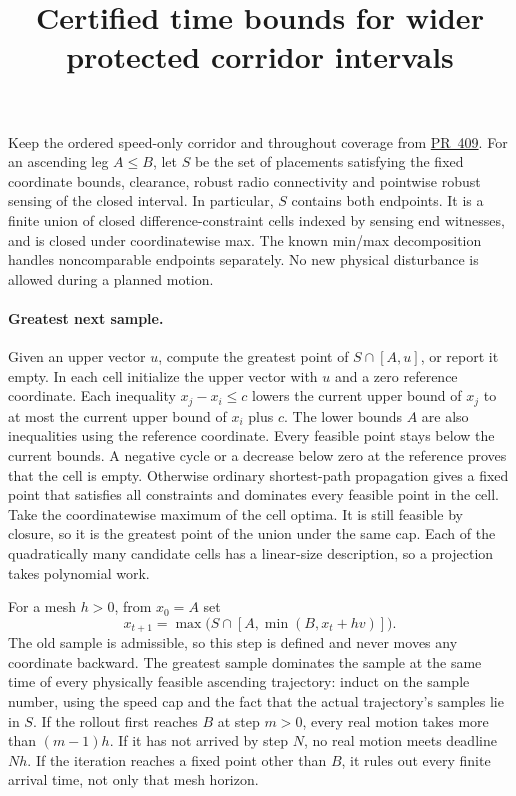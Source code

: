 \documentclass{article}
\title{Certified time bounds for wider protected corridor intervals}
\date{}
\begin{document}
\maketitle
Keep the ordered speed-only corridor and throughout coverage from
\href{https://github.com/eternal-november/eos-research-programmes/pull/409}{PR~409}.
For an ascending leg $A\le B$, let $S$ be the set of placements
satisfying the fixed coordinate bounds, clearance, robust radio
connectivity and pointwise robust sensing of the closed interval.
In particular, $S$ contains both endpoints. It is a finite union of
closed difference-constraint cells indexed by sensing end witnesses,
and is closed under coordinatewise max. The known min/max
decomposition handles noncomparable endpoints separately.
No new physical disturbance is allowed during a planned motion.

\paragraph{Greatest next sample.}
Given an upper vector $u$, compute the greatest point of
$S\cap[A,u]$, or report it empty. In each cell initialize the
upper vector with $u$ and a zero reference coordinate. Each inequality
$x_j-x_i\le c$ lowers the current upper bound of $x_j$ to at most
the current upper bound of $x_i$ plus $c$. The lower bounds $A$
are also inequalities using the reference coordinate. Every feasible
point stays below the current bounds. A negative cycle or a decrease
below zero at the reference proves that the cell is empty.
Otherwise ordinary shortest-path propagation gives a fixed point
that satisfies all constraints and dominates every feasible point
in the cell. Take the coordinatewise maximum of the cell optima.
It is still feasible by closure, so it is the greatest point
of the union under the same cap. Each of the quadratically many candidate cells has a linear-size
description, so a projection takes polynomial work.

For a mesh $h>0$, from $x_0=A$ set
\[
 x_{t+1}=\max\bigl(S\cap[A,\min(B,x_t+h v)]\bigr).
\]
The old sample is admissible, so this step is defined and never moves
any coordinate backward. The greatest sample dominates the sample
at the same time of every physically feasible ascending trajectory:
induct on the sample number, using the speed cap and the fact that
the actual trajectory's samples lie in $S$. If the rollout first
reaches $B$ at step $m>0$, every real motion takes more than
$(m-1)h$. If it has not arrived by step $N$, no real motion meets
deadline $Nh$. If the iteration reaches a fixed point other than $B$,
it rules out every finite arrival time, not only that mesh horizon.
\end{document}

